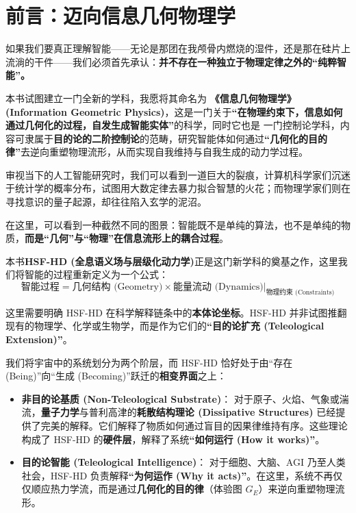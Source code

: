 \chapter*{前言：迈向信息几何物理学}


如果我们要真正理解智能——无论是那团在我颅骨内燃烧的湿件，还是那在硅片上流淌的干件——我们必须首先承认：\textbf{并不存在一种独立于物理定律之外的“纯粹智能”。}

本书试图建立一门全新的学科，我愿将其命名为 \textbf{《信息几何物理学》 (Information Geometric Physics)}，这是一门关于\textbf{“在物理约束下，信息如何通过几何化的过程，自发生成智能实体”}的科学，同时它也是
一门控制论学科，内容可隶属于\textbf{目的论的二阶控制论}的范畴，研究智能体如何通过\textbf{“几何化的目的律”}去逆向重塑物理流形，从而实现自我维持与自我生成的动力学过程。

\vspace{1em}审视当下的人工智能研究时，我们可以看到一道巨大的裂痕，计算机科学家们沉迷于统计学的概率分布，试图用大数定律去暴力拟合智慧的火花；而物理学家们则在寻找意识的量子起源，却往往陷入玄学的泥沼。

在这里，可以看到一种截然不同的图景：智能既不是单纯的算法，也不是单纯的物质，\textbf{而是“几何”与“物理”在信息流形上的耦合过程}。

本书\textbf{HSF-HD (全息语义场与层级化动力学)}正是这门新学科的奠基之作，这里我们将智能的过程重新定义为一个公式：
$$ \text{智能过程} = \text{几何结构 (Geometry)} \times \text{能量流动 (Dynamics)} \Big|_{\text{物理约束 (Constraints)}} $$



这里需要明确 HSF-HD 在科学解释链条中的\textbf{本体论坐标}。HSF-HD 并非试图推翻现有的物理学、化学或生物学，而是作为它们的\textbf{“目的论扩充 (Teleological Extension)”}。

我们将宇宙中的系统划分为两个阶层，而 HSF-HD 恰好处于由“存在 (Being)”向“生成 (Becoming)”跃迁的\textbf{相变界面}之上：

\begin{itemize}
    \item \textbf{非目的论基质 (Non-Teleological Substrate)}：
    对于原子、火焰、气象或湍流，\textbf{量子力学}与普利高津的\textbf{耗散结构理论 (Dissipative Structures)} 已经提供了完美的解释。它们解释了物质如何通过盲目的因果律维持有序。这些理论构成了 HSF-HD 的\textbf{硬件层}，解释了系统\textbf{“如何运行 (How it works)”}。

    \item \textbf{目的论智能 (Teleological Intelligence)}：
    对于细胞、大脑、AGI 乃至人类社会，HSF-HD 负责解释\textbf{“为何运作 (Why it acts)”}。在这里，系统不再仅仅顺应热力学流，而是通过\textbf{几何化的目的律}（体验图 $G_E$）来逆向重塑物理流形。
\end{itemize}


